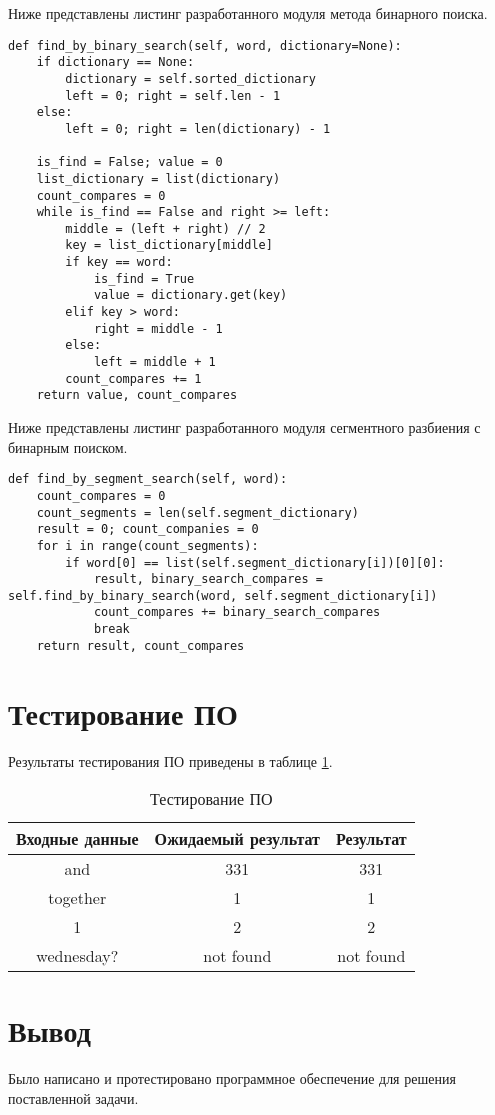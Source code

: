 Ниже представлены листинг разработанного модуля метода бинарного поиска.
\begin{lstlisting}[label = binary_search, caption=Программный код алгоритма полного перебора.]
def find_by_binary_search(self, word, dictionary=None):
	if dictionary == None:
		dictionary = self.sorted_dictionary
		left = 0; right = self.len - 1
	else:
		left = 0; right = len(dictionary) - 1

	is_find = False; value = 0
	list_dictionary = list(dictionary) 
	count_compares = 0
	while is_find == False and right >= left:
		middle = (left + right) // 2
		key = list_dictionary[middle]
		if key == word:
			is_find = True
			value = dictionary.get(key)
		elif key > word:
			right = middle - 1
		else:
			left = middle + 1
		count_compares += 1
	return value, count_compares
\end{lstlisting}
\newpage
Ниже представлены листинг разработанного модуля сегментного разбиения с бинарным поиском.
\begin{lstlisting}[label = segment_binary_search, caption=Программный код алгоритма сегментного разбиения с бинарным поиском.]
def find_by_segment_search(self, word):
	count_compares = 0
	count_segments = len(self.segment_dictionary)
	result = 0; count_companies = 0
	for i in range(count_segments):
		if word[0] == list(self.segment_dictionary[i])[0][0]:
			result, binary_search_compares = self.find_by_binary_search(word, self.segment_dictionary[i])
			count_compares += binary_search_compares
			break
	return result, count_compares
\end{lstlisting}

\section{Тестирование ПО}
Результаты тестирования ПО приведены в таблице \ref{table:testing}. 
\begin{table}[H]
	\captionsetup{singlelinecheck = false, justification=raggedleft}
	\caption{Тестирование ПО}
	\begin{center}
		\begin{tabular}{|c|c|c|}
			\hline
			Входные данные & Ожидаемый результат  & Результат \\ \hline
			and            & 331                  & 331       \\ \hline
			together       & 1                    & 1         \\ \hline
			1         	   & 2                    & 2         \\ \hline
			wednesday?     & not found            & not found \\ \hline
		\end{tabular}
	\end{center}
	\label{table:testing}
\end{table}

\section{Вывод}
Было написано и протестировано программное обеспечение для решения поставленной задачи.